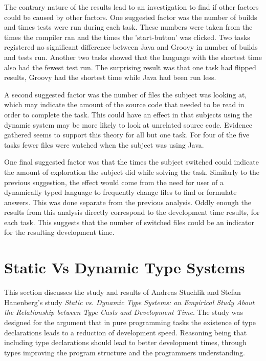 \documentclass{sig-alternate}
\begin{document}
The contrary nature of the results lead to an investigation to find if other factors could be caused by other factors. One suggested factor was the number of builds and times tests were run during each task. These numbers were taken from the times the compiler ran and the times the 'start-button' was clicked. Two tasks registered no significant difference between Java and Groovy in number of builds and tests run. Another two tasks showed that the language with the shortest time also had the fewest test run. The surprising result was that one task had flipped results, Groovy had the shortest time while Java had been run less. 

A second suggested factor was the number of files the subject was looking at, which may indicate the amount of the source code that needed to be read in order to complete the task. This  could have an effect in that subjects using the dynamic system may be more likely to look at unrelated source code. Evidence gathered seems to support this theory for all but one task. For four of the five tasks fewer files were watched when the subject was using Java.

One final suggested factor was that the times the subject switched could indicate the amount of exploration the subject did while solving the task. Similarly to the previous suggestion, the effect would come from the need for user of a dynamically typed language to frequently change files to find or formulate answers. This was done separate from the previous analysis. Oddly enough the results from this analysis directly correspond to the development time results, for each task. This suggests that the number of switched files could be an indicator for the resulting development time. 

\section{Static Vs Dynamic Type Systems}\label{benifits}
This section discusses the study and results of Andreas Stuchlik and Stefan Hanenberg's study \emph{Static vs. Dynamic Type Systems: an Empirical Study About the Relationship between Type Casts and Development Time}\cite{Stuchlik2011}. The study was designed for the argument that in pure programming tasks the existence of type declarations leads to a reduction of development speed. Reasoning being that including type declarations should lead to better development times, through types improving the program structure and the programmers understanding.
\end{document}
